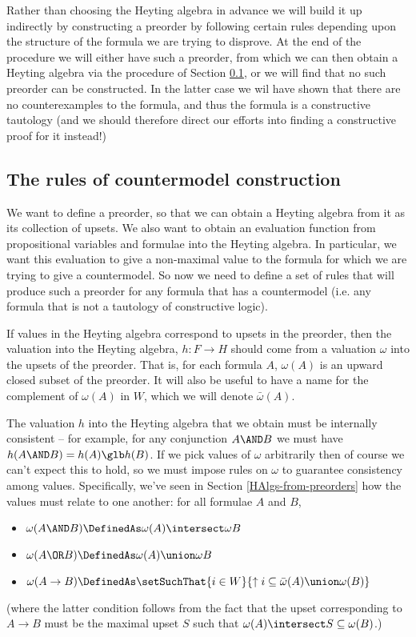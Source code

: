 Rather than choosing the Heyting algebra in advance we will build it up indirectly by constructing a preorder by following certain rules depending upon the structure of the formula we are trying to disprove.  At the end of the procedure we will either have such a preorder, from which we can then obtain a Heyting algebra via the procedure of Section \ref{}, or we will find that no such preorder can be constructed.  In the latter case we wil have shown that there are no counterexamples to the formula, and thus the formula is a constructive tautology (and we should therefore direct our efforts into finding a constructive proof for it instead!)


\subsection{The rules of countermodel construction}

We want to define a preorder, so that we can obtain a Heyting algebra from it as its collection of upsets.  We also want to obtain an evaluation function from propositional variables and formulae into the Heyting algebra.  In particular, we want this evaluation to give a non-maximal value to the formula for which we are trying to give a countermodel.  So now we need to define a set of rules that will produce such a preorder for any formula that has a countermodel (i.e. any formula that is not a tautology of constructive logic).

If values in the Heyting algebra correspond to upsets in the preorder, then the valuation into the Heyting algebra, $h: F \to H$ should come from a valuation $\omega$ into the upsets of the preorder.  That is, for each formula $A$, $\omega(A)$ is an upward closed subset of the preorder.  It will also be useful to have a name for the complement of $\omega(A)$ in $W$, which we will denote $\bar{\omega}(A)$.


The valuation $h$ into the Heyting algebra that we obtain must be internally consistent -- for example, for any conjunction $A \AND B$ we must have $h(A \AND B) = h(A) \glb h(B)$.  If we pick values of $\omega$ arbitrarily then of course we can't expect this to hold, so we must impose rules on $\omega$ to guarantee consistency among values.  Specifically, we've seen in Section \ref{HAlgs-from-preorders} how the values must relate to one another: for all formulae $A$ and $B$,
\begin{itemize}
\item $\omega(A \AND B) \DefinedAs \omega(A) \intersect \omega{B}$
\item $\omega(A \OR B) \DefinedAs \omega(A) \union \omega{B}$
\item $\omega(A \to B) \DefinedAs 
\setSuchThat{i \in W}{\uparrow i \subseteq \bar{\omega}(A) \union \omega(B)}$
\end{itemize}
(where the latter condition follows from the fact that the upset corresponding to $A \to B$ must be the maximal upset $S$ such that $\omega(A) \intersect S \subseteq \omega(B)$.)

